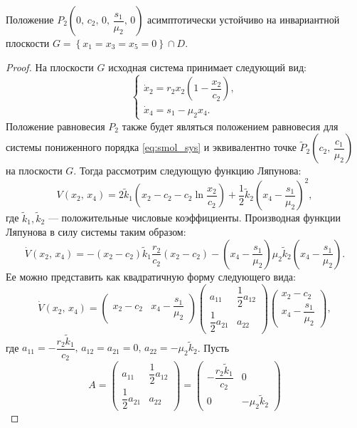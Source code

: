 \documentclass[14pt,a4paper]{extarticle}
\begin{document}
	\begin{theorem}\label{th:P2_stab}
		Положение $P_2\left(0,\, c_2,\,0,\,\dfrac{s_1}{\mu_2},\, 0\right)$ асимптотически устойчиво на инвариантной плоскости $G=\left\{x_1=x_3=x_5=0\right\}\cap D$. 
	\end{theorem}
	\begin{proof}
		На плоскости $G$ исходная система принимает следующий вид:
		\begin{equation}\label{eq:smol_sys}
			\begin{cases}
				\dot{x}_2=r_2x_2\left(1-\dfrac{x_2}{c_2}\right),\\
				\dot{x}_4=s_1-\mu_2x_4.
			\end{cases}
		\end{equation}
		Положение равновесия $P_2$ также будет являться положением равновесия для системы пониженного порядка \ref{eq:smol_sys} и эквивалентно точке $\tilde{P}_2\left(c_2,\, \dfrac{c_1}{\mu_2}\right)$ на плоскости $G$. Тогда рассмотрим следующую функцию Ляпунова:
		\[V(x_2,\, x_4)=2\tilde{k}_1\left(x_2-c_2-c_2\ln\dfrac{x_2}{c_2}\right)+\dfrac{1}{2}\tilde{k}_2\left(x_4-\dfrac{s_1}{\mu_2}\right)^2,\]
		где $\tilde{k}_1,\tilde{k}_2$ --- положительные числовые коэффициенты. Производная функции Ляпунова в силу системы таким образом:
		\[\dot{V}(x_2,\,x_4)=-(x_2-c_2)\tilde{k}_1\dfrac{r_2}{c_2}(x_2-c_2)-\left(x_4-\dfrac{s_1}{\mu_2}\right)\mu_2\tilde{k}_2\left(x_4-\dfrac{s_1}{\mu_2}\right).\]
		Ее можно представить как квадратичную форму следующего вида:
		\[\dot{V}(x_2,\, x_4)=\begin{pmatrix}
			x_2-c_2 & x_4-\dfrac{s_1}{\mu_2}
		\end{pmatrix}\begin{pmatrix}
			a_{11} & \dfrac{1}{2}a_{12}\\
			\dfrac{1}{2}a_{21} & a_{22}
		\end{pmatrix}\begin{pmatrix}
			x_2-c_2\\
			x_4-\dfrac{s_1}{\mu_2}
		\end{pmatrix},\]
		где $a_{11}=-\dfrac{r_2\tilde{k}_1}{c_2},\, a_{12}=a_{21}=0,\, a_{22}=-\mu_2\tilde{k}_2$. Пусть
		\[A=\begin{pmatrix}
			a_{11} & \dfrac{1}{2}a_{12}\\
			\dfrac{1}{2}a_{21} & a_{22}
		\end{pmatrix}=\begin{pmatrix}
			-\dfrac{r_2\tilde{k}_1}{c_2} & 0\\
			0 & -\mu_2\tilde{k}_2
		\end{pmatrix}\]

\end{proof}
\end{document}
